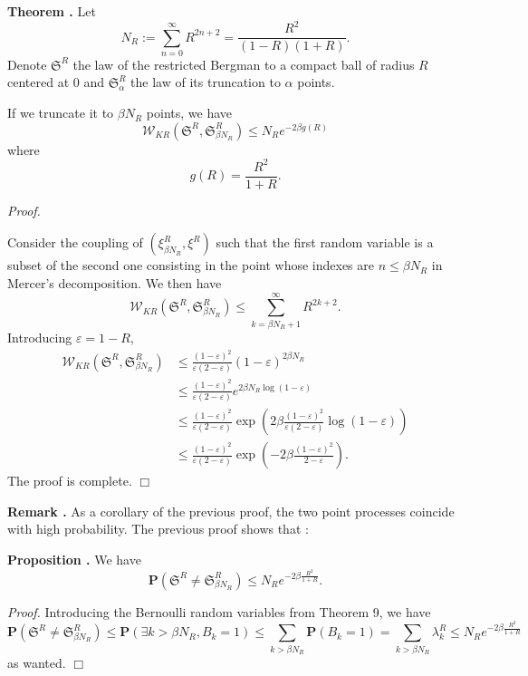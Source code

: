 \documentclass[11pt]{article}
\newcommand{\qed}{\hfill$\Box$}
\newcounter{cnt}
\newcommand{\cnt}{\thecnt \stepcounter{cnt}}
\begin{document}
\textbf{Theorem \cnt.} Let
\[
N_R := \sum_{n=0}^\infty R^{2n+2} = \frac{R^2}{(1-R)(1+R)}.
\]
Denote $\mathfrak{S}^R$ the law of the restricted Bergman to a compact ball of radius $R$ centered at 0 and $\mathfrak{S}_\alpha^R$ the law of its truncation to $\alpha$ points.

If we truncate it to $\beta N_R$ points, we have
\begin{equation}
\mathcal{W}_{KR}(\mathfrak{S}^R, \mathfrak{S}_{\beta N_R}^R) \le N_R e^{-2\beta g(R)}
\end{equation}
where
\[
g(R) = \frac{R^2}{1+R}.
\]

\textit{Proof.}

Consider the coupling of $(\xi_{\beta N_R}^R, \xi^R)$ such that the first random variable is a subset of the second one consisting in the point whose indexes are $n \le \beta N_R$ in Mercer's decomposition. We then have
\[
\mathcal{W}_{KR}(\mathfrak{S}^R, \mathfrak{S}_{\beta N_R}^R) \le \sum_{k=\beta N_R+1}^\infty R^{2k+2}.
\]
Introducing $\varepsilon = 1 - R$,
\begin{align*}
\mathcal{W}_{KR}(\mathfrak{S}^R, \mathfrak{S}_{\beta N_R}^R) &\le \frac{(1-\varepsilon)^2}{\varepsilon(2-\varepsilon)} (1-\varepsilon)^{2\beta N_R} \\
&\le \frac{(1-\varepsilon)^2}{\varepsilon(2-\varepsilon)} e^{2\beta N_R \log(1-\varepsilon)} \\
&\le \frac{(1-\varepsilon)^2}{\varepsilon(2-\varepsilon)} \exp \left( 2\beta \frac{(1-\varepsilon)^2}{\varepsilon(2-\varepsilon)} \log(1-\varepsilon) \right) \\
&\le \frac{(1-\varepsilon)^2}{\varepsilon(2-\varepsilon)} \exp \left( -2\beta \frac{(1-\varepsilon)^2}{2-\varepsilon} \right).
\end{align*}
The proof is complete. \qed

\textbf{Remark \cnt.} As a corollary of the previous proof, the two point processes coincide with high probability. The previous proof shows that :

\textbf{Proposition \cnt.} We have
\[
\mathbf{P}(\mathfrak{S}^R \neq \mathfrak{S}_{\beta N_R}^R) \le N_R e^{-2\beta \frac{R^2}{1+R}}.
\]

\textit{Proof.}
Introducing the Bernoulli random variables from Theorem 9, we have
\[
\mathbf{P}(\mathfrak{S}^R \neq \mathfrak{S}_{\beta N_R}^R) \le \mathbf{P}(\exists k > \beta N_R, B_k = 1) \le \sum_{k > \beta N_R} \mathbf{P}(B_k = 1) = \sum_{k > \beta N_R} \lambda_k^R \le N_R e^{-2\beta \frac{R^2}{1+R}}
\]
as wanted. \qed
\end{document}

